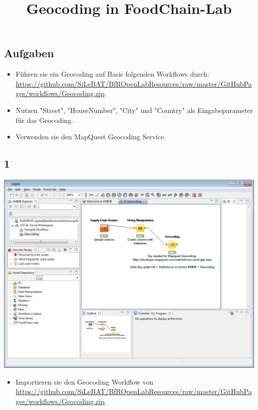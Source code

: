 \documentclass{beamer}
\title{Geocoding in FoodChain-Lab}
\date{}
\begin{document}
\maketitle

\section{ }

\subsection{Aufgaben}
\begin{frame}
	\begin{itemize}
		\item Führen sie ein Geocoding auf Basis folgenden Workflows durch: \url{https://github.com/SiLeBAT/BfROpenLabResources/raw/master/GitHubPages/workflows/Geocoding.zip}.
		\item Nutzen "Street", "HouseNumber", "City" und "Country" als Eingabeparameter für das Geocoding.
		\item Verwenden sie den MapQuest Geocoding Service.
	\end{itemize}
\end{frame}
 
\subsection{1}
\begin{frame}
	\begin{center}
  		\includegraphics[height=0.6\textheight]{1.png}
	\end{center}
	\begin{itemize}
		\item Importieren sie den Geocoding Workflow von \url{https://github.com/SiLeBAT/BfROpenLabResources/raw/master/GitHubPages/workflows/Geocoding.zip}.
	\end{itemize}
\end{frame}
\end{document}

